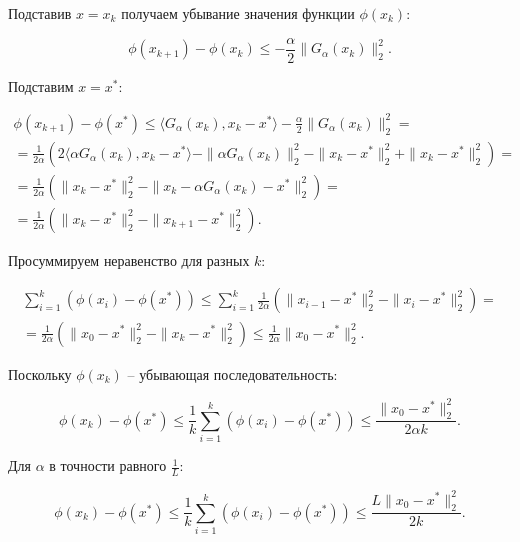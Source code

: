 Подставив $x=x_k$ получаем убывание значения функции $\phi(x_k)$:

\begin{equation}
    \phi(x_{k+1})-\phi(x_k)\leq-\frac\alpha2\|G_\alpha(x_k)\|_2^2.
\end{equation}

Подставим $x=x^*$:

\begin{equation}
    \begin{aligned}
        \phi(x_{k+1})-\phi(x^*)\leq
        \langle G_\alpha(x_k),x_k-x^*\rangle-\frac\alpha2\|G_\alpha(x_k)\|_2^2=                                                               \\=
        \frac1{2\alpha}\left(2\langle\alpha G_\alpha(x_k),x_k-x^*\rangle-\|\alpha G_\alpha(x_k)\|_2^2-\|x_k-x^*\|_2^2+\|x_k-x^*\|_2^2\right)= \\=
        \frac1{2\alpha}\left(\|x_k-x^*\|_2^2-\|x_k-\alpha G_\alpha(x_k)-x^*\|_2^2\right)=                                                     \\=
        \frac1{2\alpha}\left(\|x_k-x^*\|_2^2-\|x_{k+1}-x^*\|_2^2\right).
    \end{aligned}
\end{equation}

Просуммируем неравенство для разных $k$:

\begin{equation}
    \begin{aligned}
        \sum\limits_{i=1}^k(\phi(x_i)-\phi(x^*))\leq
        \sum\limits_{i=1}^k\frac1{2\alpha}\left(\|x_{i-1}-x^*\|_2^2-\|x_i-x^*\|_2^2\right)= \\=
        \frac1{2\alpha}\left(\|x_0-x^*\|_2^2-\|x_k-x^*\|_2^2\right)\leq
        \frac1{2\alpha}\|x_0-x^*\|_2^2.
    \end{aligned}
\end{equation}

Поскольку $\phi(x_k)$ -- убывающая последовательность:

\begin{equation}
    \phi(x_k)-\phi(x^*)\leq
    \frac1k\sum\limits_{i=1}^k(\phi(x_i)-\phi(x^*))\leq
    \frac{\|x_0-x^*\|_2^2}{2\alpha k}.
\end{equation}

Для $\alpha$ в точности равного $\frac1L$:

\begin{equation}
    \phi(x_k)-\phi(x^*)\leq
    \frac1k\sum\limits_{i=1}^k(\phi(x_i)-\phi(x^*))\leq
    \frac{L\|x_0-x^*\|_2^2}{2k}.
\end{equation}

